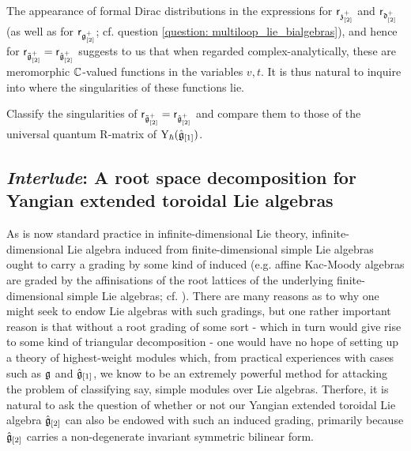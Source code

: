         \begin{remark} \label{remark: toroidal_classical_R_matrices_as_meromorphic_functions}
            The appearance of formal Dirac distributions in the expressions for $\mathsf{r}_{\mathfrak{z}_{[2]}^+}$ and $\mathsf{r}_{\mathfrak{d}_{[2]}^+}$ (as well as for $\mathsf{r}_{\mathfrak{g}_{[2]}^+}$; cf. question \ref{question: multiloop_lie_bialgebras}), and hence for $\mathsf{r}_{\tilde{\mathfrak{g}}_{[2]}^+} = \mathsf{r}_{\hat{\mathfrak{g}}_{[2]}^+}$ suggests to us that when regarded complex-analytically, these are meromorphic $\mathbb{C}$-valued functions in the variables $v, t$. It is thus natural to inquire into where the singularities of these functions lie. 
        \end{remark}
        \begin{question}
            Classify the singularities of $\mathsf{r}_{\tilde{\mathfrak{g}}_{[2]}^+} = \mathsf{r}_{\hat{\mathfrak{g}}_{[2]}^+}$ and compare them to those of the universal quantum R-matrix of $\mathrm{Y}_{\hbar}(\hat{\mathfrak{g}}_{[1]})$. 
        \end{question}

    \subsection{\textit{Interlude}: A root space decomposition for Yangian extended toroidal Lie algebras}
        As is now standard practice in infinite-dimensional Lie theory, infinite-dimensional Lie algebra induced from finite-dimensional simple Lie algebras ought to carry a grading by some kind of induced  (e.g. affine Kac-Moody algebras are graded by the affinisations of the root lattices of the underlying finite-dimensional simple Lie algebras; cf. \cite[Chapter 6]{kac_infinite_dimensional_lie_algebras}). There are many reasons as to why one might seek to endow Lie algebras with such gradings, but one rather important reason is that without a root grading of some sort - which in turn would give rise to some kind of triangular decomposition - one would have no hope of setting up a theory of highest-weight modules which, from practical experiences with cases such as $\mathfrak{g}$ and $\hat{\mathfrak{g}}_{[1]}$, we know to be an extremely powerful method for attacking the problem of classifying say, simple modules over Lie algebras. Therfore, it is natural to ask the question of whether or not our Yangian extended toroidal Lie algebra $\hat{\mathfrak{g}}_{[2]}$ can also be endowed with such an induced grading, primarily because $\hat{\mathfrak{g}}_{[2]}$ carries a non-degenerate invariant symmetric bilinear form.

